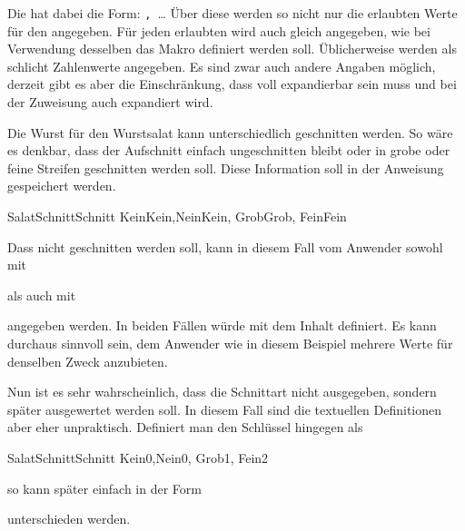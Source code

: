 Die  hat dabei die Form:
    \texttt{,}\linebreak[1]%
    ~\dots{}
Über diese  werden so nicht nur die erlaubten Werte für den
 angegeben. Für jeden erlaubten  wird auch
gleich angegeben, wie bei Verwendung desselben das Makro
 definiert werden soll. Üblicherweise werden als
 schlicht Zahlenwerte angegeben. Es sind zwar auch andere
Angaben möglich, derzeit gibt es aber die Einschränkung, dass
 voll expandierbar sein muss und bei der Zuweisung auch
expandiert wird.
\begin{Example}
  Die Wurst für den Wurstsalat kann unterschiedlich geschnitten werden. So
  wäre es denkbar, dass der Aufschnitt einfach ungeschnitten bleibt oder in
  grobe oder feine Streifen geschnitten werden soll. Diese Information soll in
  der Anweisung  gespeichert werden.
\begin{lstcode}
                     {SalatSchnitt}{Schnitt}{%
                       {Kein}{Kein},{Nein}{Kein},%
                       {Grob}{Grob},%
                       {Fein}{Fein}%
                     }
\end{lstcode}
  Dass nicht geschnitten werden soll, kann in diesem Fall vom Anwender sowohl
  mit
\begin{lstcode}
\end{lstcode}
  als auch mit
\begin{lstcode}
\end{lstcode}
  angegeben werden. In beiden Fällen würde  mit dem Inhalt
   definiert. Es kann durchaus sinnvoll sein, dem Anwender wie in
  diesem Beispiel mehrere Werte für denselben Zweck anzubieten.

  Nun ist es sehr wahrscheinlich, dass die Schnittart nicht ausgegeben,
  sondern später ausgewertet werden soll. In diesem Fall sind die textuellen
  Definitionen aber eher unpraktisch. Definiert man den Schlüssel hingegen als
\begin{lstcode}
                     {SalatSchnitt}{Schnitt}{%
                       {Kein}{0},{Nein}{0},%
                       {Grob}{1},%
                       {Fein}{2}%
                     }
\end{lstcode}
  so kann später einfach in der Form
\begin{lstcode}
  \ifcase\Schnitt
  \or
  \else
  \fi
\end{lstcode}
  unterschieden werden.
\end{Example}


